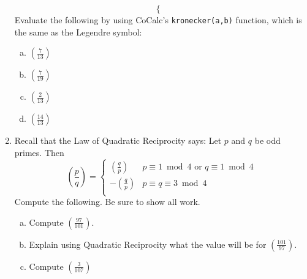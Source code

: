 \documentclass[12pt]{amsart}
\theoremstyle{plain}
\theoremstyle{definition}
\begin{document}
\begin{enumerate}[1.]
\[\begin{cases}
   \end{cases}
	\]
	Evaluate the following by using CoCalc's \texttt{kronecker(a,b)} function, which is the same as the Legendre symbol:
	\begin{enumerate}[a.]
		\item $\left( \frac{7}{13} \right)$
		\begin{framed}
		\vspace{.3in}
		\end{framed}
		\item $\left( \frac{7}{19} \right)$
		\begin{framed}
		\vspace{.3in}
		\end{framed}
		\item $\left( \frac{2}{13} \right)$
		\begin{framed}
		\vspace{.3in}
		\end{framed}
		\item $\left( \frac{14}{13} \right)$
		\begin{framed}
		\vspace{1in}
		\end{framed}
	\end{enumerate}
	\item Recall that the Law of Quadratic Reciprocity says:  Let $p$ and $q$ be odd primes.  Then
		\[ \left( \frac{p}{q}\right) = \begin{cases} 
      		\left( \frac{q}{p}\right) & p \equiv 1 \bmod 4 \text{ or } q \equiv 1 \bmod 4\\
      		-\left(\frac{q}{p}\right) & p \equiv q \equiv 3 \bmod 4\\
  		 \end{cases}
		\]
		Compute the following.  Be sure to show all work.
		\begin{enumerate}[a.]
		\item  Compute $\left(\frac{97}{101}\right)$.
		\begin{framed}
		\vspace{.3in}
		\end{framed}
		\item Explain using Quadratic Reciprocity what the value will be for $\left(\frac{101}{97}\right)$.
		\begin{framed}
		\vspace{.5in}
		\end{framed}
		\newpage \item Compute $\left(\frac{3}{107}\right)$
		\begin{framed}

\end{framed}
\end{enumerate}
\end{enumerate}
\end{document}
